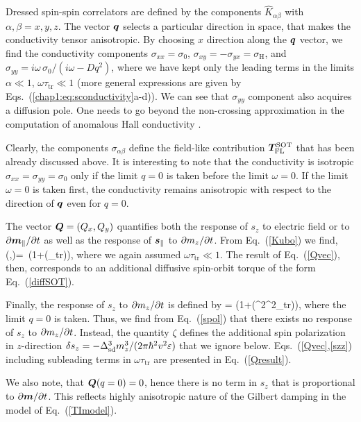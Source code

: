 Dressed spin-spin correlators are defined by the components $ \hat{K}_{\alpha\beta}$ with $\alpha,\beta=x,y,z$.
The vector $\boldsymbol{q}$ selects a particular direction in space, that makes the conductivity tensor anisotropic. By choosing $x$ direction along the $\boldsymbol{q}$ vector, we find the conductivity components $\sigma_{xx} = \sigma_0$, $\sigma_{xy} = -\sigma_{yx}=\sigma_\textrm{H}$, and $\sigma_{yy}= i\omega \,\sigma_0/(i\omega-Dq^2)$, where we have kept only the leading terms in the limits $\alpha\ll 1$, $\omega\tau_\textrm{tr}\ll 1$ (more general expressions are given by Eqs.~(\ref{chap1:eq:sconductivity}a-d)). We can see that $\sigma_{yy}$ component also acquires a diffusion pole.  One needs to go beyond the non-crossing approximation in the computation of anomalous Hall conductivity  \cite{ivanEPL,ivanPRL,ivanPRB}. 

Clearly, the components $\sigma_{\alpha\beta}$ define the field-like contribution $\boldsymbol{T}^\textrm{SOT}_\textrm{FL}$ that has been already discussed above. It is interesting to note that the conductivity is isotropic $\sigma_{xx}=\sigma_{yy}=\sigma_0$ only if the limit $q= 0$ is taken before the limit $\omega=0$. If the limit $\omega=0$ is taken first, the conductivity remains anisotropic with respect to the direction of $\boldsymbol{q}$ even for $q=0$.

The vector $\boldsymbol{Q}=(Q_x,Q_y)$ quantifies both the response of $s_z$ to electric field or to $\partial \boldsymbol{m}_\parallel/\partial t$ as well as the response of $\boldsymbol{s}_\parallel$ to  $\partial m_z/\partial t$. From Eq.~(\ref{Kubo}) we find,
\be
\label{Qvec}
(\omega,)=\, \lt(1+(\omega\tau_\textrm{tr})\rt),
\e
where we again assumed $\omega\tau_\textrm{tr} \ll 1$. The result of Eq.~(\ref{Qvec}), then, corresponds to an additional diffusive spin-orbit torque of the form Eq.~(\ref{diffSOT}).

Finally, the response of $s_z$ to $\partial m_z/\partial t$ is defined by 
\be
\label{szz}
\zeta = \lt(1+(\omega^2\tau^2_\textrm{tr})\rt),
\e
where the limit $q=0$ is taken. Thus, we find from Eq.~(\ref{spol}) that there exists no response of $s_z$ to $\partial m_z/\partial t$. Instead, the quantity $\zeta$ defines the additional spin polarization in $z$-direction $\delta s_z = - \Delta_\textrm{sd}^3m_z^3/(2\pi \hslash^2 v^2\varepsilon)$ that we ignore below. Eqs.~(\ref{Qvec},\ref{szz}) including subleading terms in $\omega\tau_\mathrm{tr}$ are presented in Eq.~(\ref{Qresult}).

We also note, that $\boldsymbol{Q}(q=0)=0$, hence there is no term in $s_z$ that is proportional to $\partial\boldsymbol{m}/\partial t$. This reflects highly anisotropic nature of the Gilbert damping in the model of Eq.~(\ref{TImodel}).

